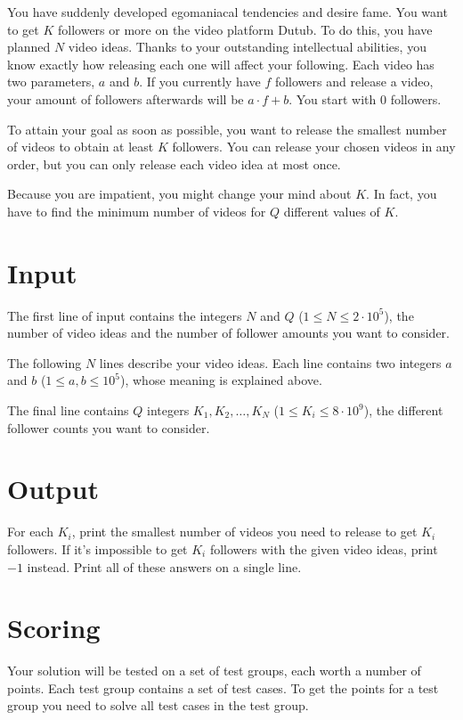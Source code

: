 
\noindent
You have suddenly developed egomaniacal tendencies and desire fame. You want to get $K$ followers or more on the video platform
Dutub. To do this, you have planned $N$ video ideas. Thanks to your outstanding intellectual abilities, you know exactly
how releasing each one will affect your following. Each video has two parameters, $a$ and $b$. If you currently have $f$ followers
and release a video, your amount of followers afterwards will be $a \cdot f + b$. You start with $0$ followers.

To attain your goal as soon as possible, you want to release the smallest number of videos to obtain at least $K$ followers.
You can release your chosen videos in any order, but you can only release each video idea at most once.

Because you are impatient, you might change your mind about $K$. In fact, you have to find the minimum number of videos
for $Q$ different values of $K$.

\section*{Input}
The first line of input contains the integers $N$ and $Q$ ($1 \le N \le 2 \cdot 10^5$), the number of video ideas
and the number of follower amounts you want to consider.

The following $N$ lines describe your video ideas. Each line contains two integers $a$ and $b$ ($1 \leq a, b \leq 10^5$),
whose meaning is explained above.

The final line contains $Q$ integers $K_1, K_2, \dots, K_N$ ($1 \leq K_i \leq 8 \cdot 10^9$), the different follower counts
you want to consider.

\section*{Output}
For each $K_i$, print the smallest number of videos you need to release to get $K_i$ followers. If it's impossible
to get $K_i$ followers with the given video ideas, print $-1$ instead.
Print all of these answers on a single line.

\section*{Scoring}
Your solution will be tested on a set of test groups, each worth a number of points. Each test group contains
a set of test cases. To get the points for a test group you need to solve all test cases in the test group.

